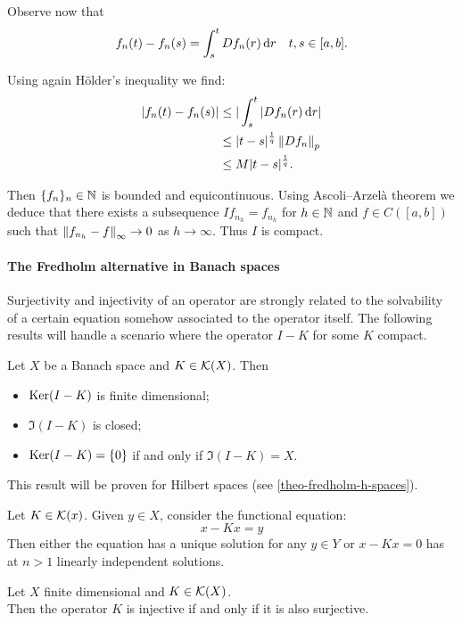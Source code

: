 Observe now that 
$$f_n(t)- f_n(s) = \int_s^t Df_n(r)\, \mathrm d r \quad t,s \in [a,b].$$

Using again Hölder's inequality we find:
\begin{align*}
	|f_n(t) - f_n(s)| &\leq |\int_s^t |Df_n(r) \, \mathrm d r|\\
	& \leq |t-s|^{\frac 1 q} \left\lVert Df_n\right\rVert_{p} \\
	& \leq M |t-s|^{\frac 1 q}.
\end{align*}

Then $\{f_n\}_n\in\mathbb N$ is bounded and equicontinuous. Using Ascoli--Arzelà theorem we deduce that there exists a subsequence $I f_{n_h} = f_{n_h}$ for $h \in \mathbb N$ and $f\in C([a,b])$ such that $\left\lVert f_{n_h}-f\right\rVert_\infty \to 0$ as $h \to \infty$. Thus $I$ is compact.

\paragraph{The Fredholm alternative in Banach spaces}
Surjectivity and injectivity of an operator are strongly related to the solvability of a certain equation somehow associated to the operator itself. The following results will handle a scenario where the operator $I-K$ for some $K$ compact.

\begin{theo}
	Let $X$ be a Banach space and $K \in \mathcal K(X)$. Then 
	\begin{itemize}
		\item $\operatorname{Ker}(I-K)$ is finite dimensional;
		\item $\Im(I-K)$ is closed;
		\item $\operatorname{Ker}(I-K) = \{0\}$ if and only if $\Im(I-K) =X$.
	\end{itemize}
\end{theo}
This result will be proven for Hilbert spaces (see \vref{theo-fredholm-h-spaces}).

\medskip
\begin{coro}
	\label{coro-fredholm-b-spaces}
	Let $K \in \mathcal K(x)$. Given $y \in X$, consider the functional equation:
	$$
		x-Kx=y
	$$
	Then either the equation has a unique solution for any $y \in Y$ or $x-Kx=0$ has at $n>1$ linearly independent solutions.
\end{coro}

\begin{coro}
	Let $X$ finite dimensional and $K \in \mathcal K(X)$.\\
	Then the operator $K$ is injective if and only if it is also surjective.
\end{coro}

